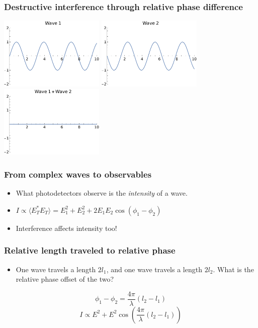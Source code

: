 \documentclass{beamer}
\begin{document}
\begin{frame}
  \frametitle{Destructive interference through relative phase difference}
  \begin{center}
  \includegraphics[width=5cm]{wave1pres} 
  \includegraphics[width=5cm]{wave3pres}
  \\
  \includegraphics[width=5cm]{destructivepres}
\end{center}
\end{frame}

\begin{frame}
  \frametitle{From complex waves to observables}
  \begin{itemize}
    \item
    What photodetectors observe is the \textit{intensity} of a wave.
  \item
    $I \propto \langle E_T^* E_T \rangle = E_1^2 + E_2^2 + 2 E_1 E_2 \cos(\phi_1 - \phi_2)$
  \item Interference affects intensity too!
\end{itemize}
\end{frame}

\begin{frame}
  \frametitle{Relative length traveled to relative phase}
  \begin{itemize}
    \item One wave travels a length $2l_1$, and one wave travels a length $2l_2$. What is the relative phase offset of the two?
    \end{itemize}
  \begin{equation*}\phi_1 - \phi_2 = \frac{4\pi}{\lambda} \left(l_2 - l_1 \right)\end{equation*}
    \begin{equation*} 
      I \propto E^2  + E^2 \cos\left(\frac{4\pi}{\lambda} (l_2 - l_1) \right)
    \end{equation*}
  \end{frame}
\end{document}
